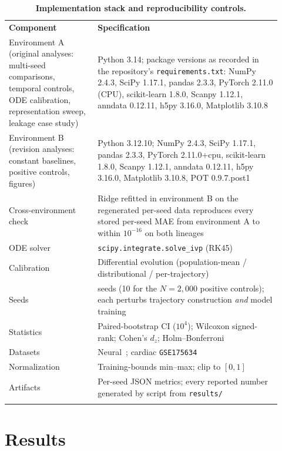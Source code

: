 \documentclass[10pt,letterpaper]{article}
\newlength\savedwidth
\newcommand\thickhline{\noalign{\global\savedwidth\arrayrulewidth\global\arrayrulewidth 2pt}%
\hline
\noalign{\global\arrayrulewidth\savedwidth}}
\begin{document}
\begin{table}[!ht]
\centering
\caption{\textbf{Implementation stack and reproducibility controls.}}
\label{tab:impl_repro}
\begin{tabular}{>{\raggedright\arraybackslash}p{0.30\linewidth} >{\raggedright\arraybackslash}p{0.62\linewidth}}
\thickhline
\textbf{Component} & \textbf{Specification} \\
\thickhline
Environment A (original analyses: multi-seed comparisons, temporal controls, ODE calibration, representation sweep, leakage case study) & Python 3.14; package versions as recorded in the repository's \texttt{requirements.txt}: NumPy 2.4.3, SciPy 1.17.1, pandas 2.3.3, PyTorch 2.11.0 (CPU), scikit-learn 1.8.0, Scanpy 1.12.1, anndata 0.12.11, h5py 3.16.0, Matplotlib 3.10.8 \\
\hline
Environment B (revision analyses: constant baselines, positive controls, figures) & Python 3.12.10; NumPy 2.4.3, SciPy 1.17.1, pandas 2.3.3, PyTorch 2.11.0+cpu, scikit-learn 1.8.0, Scanpy 1.12.1, anndata 0.12.11, h5py 3.16.0, Matplotlib 3.10.8, POT 0.9.7.post1 \\
\hline
Cross-environment check & Ridge refitted in environment B on the regenerated per-seed data reproduces every stored per-seed MAE from environment A to within $10^{-16}$ on both lineages \\
\hline
ODE solver & \texttt{scipy.integrate.solve\_ivp} (RK45) \\
\hline
Calibration & Differential evolution (population-mean / distributional / per-trajectory) \\
\hline
Seeds & 20 seeds (10 for the $N=2{,}000$ positive controls); each perturbs trajectory construction \emph{and} model training \\
\hline
Statistics & Paired-bootstrap CI ($10^4$); Wilcoxon signed-rank; Cohen's $d_z$; Holm--Bonferroni \\
\hline
Datasets & Neural~\cite{jerber2021population}; cardiac \texttt{GSE175634}~\cite{elorbany2022single} \\
\hline
Normalization & Training-bounds min--max; clip to $[0,1]$ \\
\hline
Artifacts & Per-seed JSON metrics; every reported number generated by script from \texttt{results/} \\
\thickhline
\end{tabular}
\end{table}


\section*{Results}
\label{sec:results}
\end{document}
